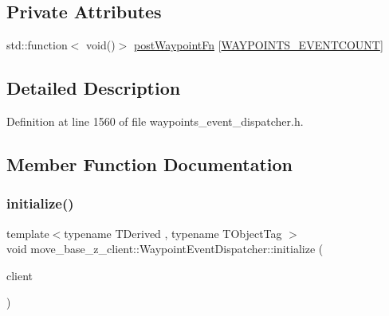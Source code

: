 \subsection*{Private Attributes}
\begin{DoxyCompactItemize}
\item 
std\+::function$<$ void()$>$ \hyperlink{classmove__base__z__client_1_1WaypointEventDispatcher_acc538eb7506c13f7cca2268a1742dadd}{post\+Waypoint\+Fn} \mbox{[}\hyperlink{waypoints__event__dispatcher_8h_add4ce0c5d955be6047a4820c63e7df08}{W\+A\+Y\+P\+O\+I\+N\+T\+S\+\_\+\+E\+V\+E\+N\+T\+C\+O\+U\+NT}\mbox{]}
\end{DoxyCompactItemize}


\subsection{Detailed Description}


Definition at line 1560 of file waypoints\+\_\+event\+\_\+dispatcher.\+h.



\subsection{Member Function Documentation}
\mbox{\label{classmove__base__z__client_1_1WaypointEventDispatcher_a70fc3a92c59e40648f350f3912d736ae}} 
\subsubsection{\texorpdfstring{initialize()}{initialize()}}
{\footnotesize\ttfamily template$<$typename T\+Derived , typename T\+Object\+Tag $>$ \\
void move\+\_\+base\+\_\+z\+\_\+client\+::\+Waypoint\+Event\+Dispatcher\+::initialize (\begin{DoxyParamCaption}\item[{\hyperlink{classmove__base__z__client_1_1ClMoveBaseZ}{Cl\+Move\+BaseZ} $\ast$}]{client }\end{DoxyParamCaption})}



